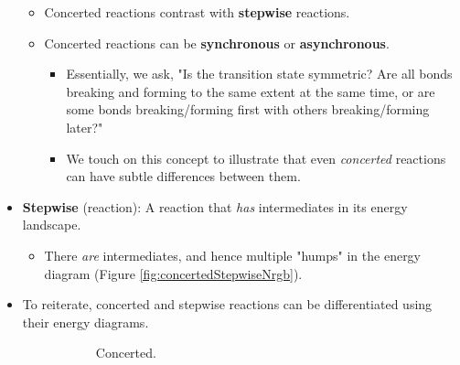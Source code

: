 \documentclass[../notes.tex]{subfiles}
\begin{document}
\begin{itemize}
\begin{itemize}
        \item Concerted reactions contrast with \textbf{stepwise} reactions.
        \item Concerted reactions can be \textbf{synchronous} or \textbf{asynchronous}.
        \begin{itemize}
            \item Essentially, we ask, "Is the transition state symmetric? Are all bonds breaking and forming to the same extent at the same time, or are some bonds breaking/forming first with others breaking/forming later?"
            \item We touch on this concept to illustrate that even \emph{concerted} reactions can have subtle differences between them.
        \end{itemize}
    \end{itemize}
    \item \textbf{Stepwise} (reaction): A reaction that \emph{has} intermediates in its energy landscape.
    \begin{itemize}
        \item There \emph{are} intermediates, and hence multiple "humps" in the energy diagram (Figure \ref{fig:concertedStepwiseNrgb}).
    \end{itemize}
    \item To reiterate, concerted and stepwise reactions can be differentiated using their energy diagrams.
    \begin{figure}[h!]
        \centering
        \begin{subfigure}[b]{0.25\linewidth}
            \centering
            \caption{Concerted.}
            \label{fig:concertedStepwiseNrga}
        \end{subfigure}
        \begin{subfigure}[b]{0.25\linewidth}
            \centering
\end{subfigure}
\end{figure}
\end{itemize}
\end{document}
